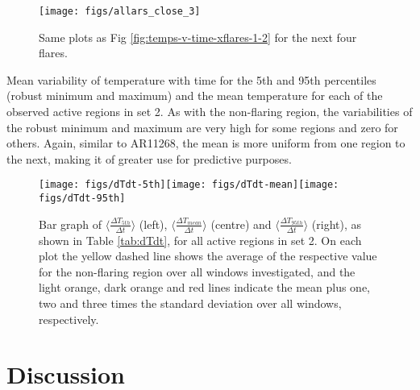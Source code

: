 \documentclass[namedreferences]{solarphysics}
\begin{document}
\begin{figure}
\begin{centering}
\texttt{[image: figs/allars\_close\_3]} 
\par\end{centering}

\caption{Same plots as Fig \ref{fig:temps-v-time-xflares-1-2} for the next four flares.\label{fig:temps-v-time-xflares-1-3}}
\end{figure}

\begin{table}
\caption{Mean variability of temperature with time for the 5th and 95th percentiles (robust minimum and maximum) and the mean temperature for each of the observed active regions in set 2.
As with the non-flaring region, the variabilities of the robust minimum and maximum are very high for some regions and zero for others.
Again, similar to AR11268, the mean is more uniform from one region to the next, making it of greater use for predictive purposes.\label{tab:dTdt}}
\end{table}

\begin{figure}
\begin{centering}
\texttt{[image: figs/dTdt-5th]}\texttt{[image: figs/dTdt-mean]}\texttt{[image: figs/dTdt-95th]}
\par\end{centering}

\caption{Bar graph of $\langle\frac{\Delta T_{5th}}{\Delta t}\rangle$ (left), $\langle\frac{\Delta T_{mean}}{\Delta t}\rangle$ (centre) and $\langle\frac{\Delta T_{95th}}{\Delta t}\rangle$ (right), as shown in Table \ref{tab:dTdt}, for all active regions in set 2.
On each plot the yellow dashed line shows the average of the respective value for the non-flaring region over all windows investigated, and the light orange, dark orange and red lines indicate the mean plus one, two and three times the standard deviation over all windows, respectively.\label{fig:Bar-graph-flaring}}
\end{figure}


\section{Discussion}
\end{document}
